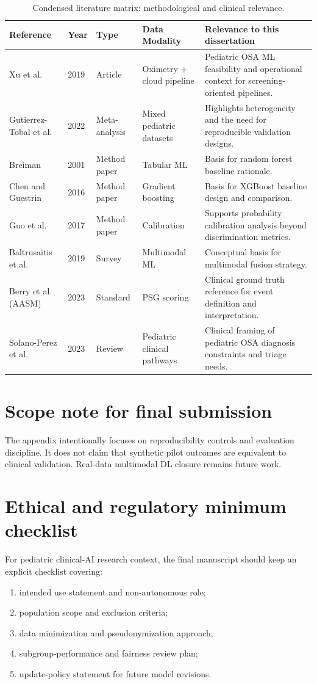 \begin{table}[t]
\centering
\scriptsize
\setlength{\tabcolsep}{4pt}
\caption{Condensed literature matrix: methodological and clinical relevance.}
\label{tab:lit_matrix}
\begin{tabular}{p{2.7cm}p{1.1cm}p{1.6cm}p{2.2cm}p{7.8cm}}
\toprule
Reference & Year & Type & Data Modality & Relevance to this dissertation \\
\midrule
Xu et al. & 2019 & Article & Oximetry + cloud pipeline & Pediatric OSA ML feasibility and operational context for screening-oriented pipelines. \\
Gutierrez-Tobal et al. & 2022 & Meta-analysis & Mixed pediatric datasets & Highlights heterogeneity and the need for reproducible validation designs. \\
Breiman & 2001 & Method paper & Tabular ML & Basis for random forest baseline rationale. \\
Chen and Guestrin & 2016 & Method paper & Gradient boosting & Basis for XGBoost baseline design and comparison. \\
Guo et al. & 2017 & Method paper & Calibration & Supports probability calibration analysis beyond discrimination metrics. \\
Baltrusaitis et al. & 2019 & Survey & Multimodal ML & Conceptual basis for multimodal fusion strategy. \\
Berry et al. (AASM) & 2023 & Standard & PSG scoring & Clinical ground truth reference for event definition and interpretation. \\
Solano-Perez et al. & 2023 & Review & Pediatric clinical pathways & Clinical framing of pediatric OSA diagnosis constraints and triage needs. \\
\bottomrule
\end{tabular}
\end{table}

\section{Scope note for final submission}
The appendix intentionally focuses on reproducibility controls and evaluation discipline. It does not claim that synthetic pilot outcomes are equivalent to clinical validation. Real-data multimodal DL closure remains future work.

\section{Ethical and regulatory minimum checklist}
For pediatric clinical-AI research context, the final manuscript should keep an explicit checklist covering:
\begin{enumerate}[leftmargin=1.2cm]
    \item intended use statement and non-autonomous role;
    \item population scope and exclusion criteria;
    \item data minimization and pseudonymization approach;
    \item subgroup-performance and fairness review plan;
    \item update-policy statement for future model revisions.
\end{enumerate}

